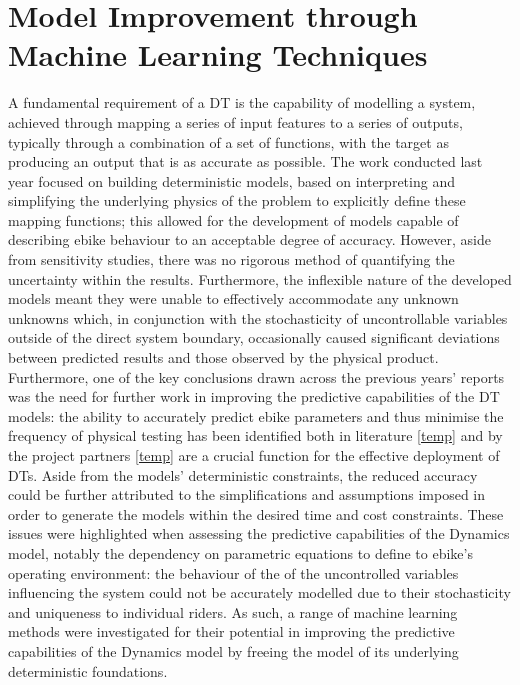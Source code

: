 \documentclass[a4paper, 10pt]{article}
\numberwithin{equation}{section}
\begin{document}
\newpage

\section{Model Improvement through Machine Learning Techniques}
\label{sec:Machine_Learning}
A fundamental requirement of a DT is the capability of modelling a system, achieved through mapping a series of input features to a series of outputs, typically through a combination of a set of functions, with the target as producing an output that is as accurate as possible. The work conducted last year focused on building deterministic models, based on interpreting and simplifying the underlying physics of the problem to explicitly define these mapping functions; this allowed for the development of models capable of describing ebike behaviour to an acceptable degree of accuracy. However, aside from sensitivity studies, there was no rigorous method of quantifying the uncertainty within the results. Furthermore, the inflexible nature of the developed models meant they were unable to effectively accommodate any unknown unknowns which, in conjunction with the stochasticity of uncontrollable variables outside of the direct system boundary, occasionally caused significant deviations between predicted results and those observed by the physical product. Furthermore, one of the key conclusions drawn across the previous years' reports was the need for further work in improving the predictive capabilities of the DT models: the ability to accurately predict ebike parameters and thus minimise the frequency of physical testing has been identified both in literature \ref{temp} and by the project partners \ref{temp} are a crucial function for the effective deployment of DTs. Aside from the models' deterministic constraints, the reduced accuracy could be further attributed to the simplifications and assumptions imposed in order to generate the models within the desired time and cost constraints. These issues were highlighted when assessing the predictive capabilities of the Dynamics model, notably the dependency on parametric equations to define to ebike's operating environment: the behaviour of the of the uncontrolled variables influencing the system could not be accurately modelled due to their stochasticity and uniqueness to individual riders. As such, a range of machine learning methods were investigated for their potential in improving the predictive capabilities of the Dynamics model by freeing the model of its underlying deterministic foundations. \medbreak
\end{document}
